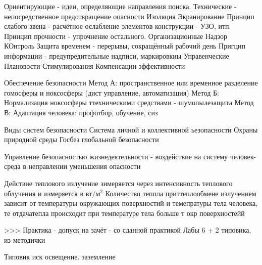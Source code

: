 \documentclass[a4paper,12pt]{report}
\begin{document}
	
	Ориентирующие - идеи, определяющие направления поиска.
	Технические - непосредственное предотвращение опасности
		Изоляция
		Экранирование
		Принцип слабого звена - расчётное ослабление элементов конструкции - УЗО, итп.
		Принцип прочности - упрочнение остального.
	Организационные
		Надзор
		КОнтроль
		Защита временем - перерывы, сокращённый рабочий день
		Пригцип информации - предупредительные надписи, маркировкиы
	Управенческие
		Плановости
		Стимулирования
		Компенсации
		эффективности
	
	Обеспечение безопасности
	Метод А: пространственное или временное разделение гомосферы и ноксосферы (дист управление, автоматизация)
	Метод Б: Нормализация ноксосферы ттехническими средствами  - шумопылезащита
	Метод В: Адаптация человека: профотбор, обучение, сиз
	
	
	Виды систем безопасности
		Система личной и коллективной ьезопасности
		Охраны природной среды
		Госбез
		глобальной безопасности
		
		
	Управление безопасностью жизнедеятельности - воздействие на систему человек-среда в неправлении уменьшения опасности
	
	
	Действие теплового излучение зимеряется через интенсивность теплового облучения и измеряется в $вт/м^2$
	Количество теппла приттеплообмене излучением зависит от температуры окружающих поверхностий и темепратуры тела человека, те отдачатепла происходит при температуре тела больше т окр поверхностейй
	
		
		
	
>>> Практика - допуск на зачёт - со сданной практикой
	Лабы 6 + 2 типовика, из методички 
	
	Типовик иск освещение. заземление		
\end{document}
